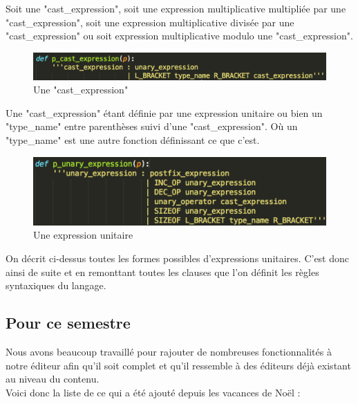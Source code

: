 \documentclass[a4paper,12pt]{article}
\begin{document}
		Soit une "cast\_expression", soit une expression multiplicative multipliée par une "cast\_expression", soit une expression multiplicative divisée par une "cast\_expression" ou soit expression multiplicative modulo une "cast\_expression".
		
		\begin{figure}[!h]
			\begin{center}
				\includegraphics[scale=0.7]{images/yacc2}
				\caption{Une "cast\_expression"}
			\end{center}
		\end{figure}
		
		Une "cast\_expression" étant définie par une expression unitaire ou bien un "type\_name" entre parenthèses suivi d'une "cast\_expression". Où un "type\_name" est une autre fonction définissant ce que c'est.
		
		\begin{figure}[!h]
			\begin{center}
				\includegraphics[scale=0.7]{images/yacc3}
				\caption{Une expression unitaire}
			\end{center}
		\end{figure}
		
		On décrit ci-dessus toutes les formes possibles d'expressions unitaires. C'est donc ainsi de suite et en remonttant toutes les clauses que l'on définit les règles syntaxiques du langage.
		
	\subsection{Pour ce semestre}
	
		Nous avons beaucoup travaillé pour rajouter de nombreuses fonctionnalités à notre éditeur afin qu'il soit complet et qu'il ressemble à des éditeurs déjà existant au niveau du contenu.\\
		
		Voici donc la liste de ce qui a été ajouté depuis les vacances de Noël :
		
\end{document}
